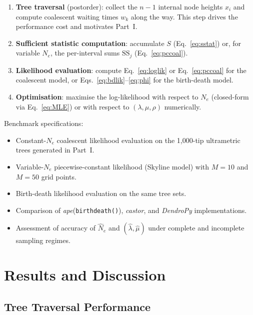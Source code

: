 \documentclass[11pt, a4paper]{article}
\newcommand{\ape}{\textit{ape}}
\newcommand{\dendropy}{\textit{DendroPy}}
\newcommand{\castor}{\textit{castor}}
\begin{document}
\begin{enumerate}
    \item \textbf{Tree traversal} (postorder): collect the $n - 1$ internal node
          heights $x_i$ and compute coalescent waiting times $w_k$ along the way.
          This step drives the performance cost and motivates Part~I.
    \item \textbf{Sufficient statistic computation}: accumulate $S$ (Eq.~\ref{eq:sstat})
          or, for variable $N_e$, the per-interval sums $\mathrm{SS}_j$
          (Eq.~\ref{eq:pccoal}).
    \item \textbf{Likelihood evaluation}: compute Eq.~\eqref{eq:loglik} or
          Eq.~\eqref{eq:pccoal} for the coalescent model, or Eqs.~\eqref{eq:bdlik}--\eqref{eq:phi}
          for the birth-death model.
    \item \textbf{Optimisation}: maximise the log-likelihood with respect to $N_e$
          (closed-form via Eq.~\ref{eq:MLE}) or with respect to $(\lambda, \mu, \rho)$
          numerically.
\end{enumerate}

Benchmark specifications:
\begin{itemize}
    \item Constant-$N_e$ coalescent likelihood evaluation on the 1{,}000-tip ultrametric
          trees generated in Part~I.
    \item Variable-$N_e$ piecewise-constant likelihood (Skyline model) with $M = 10$
          and $M = 50$ grid points.
    \item Birth-death likelihood evaluation on the same tree sets.
    \item Comparison of \ape (\texttt{birthdeath()}), \castor, and \dendropy
          implementations.
    \item Assessment of accuracy of $\hat{N}_e$ and $(\hat\lambda, \hat\mu)$ under
          complete and incomplete sampling regimes.
\end{itemize}

\section{Results and Discussion}

\subsection{Tree Traversal Performance}
\end{document}
